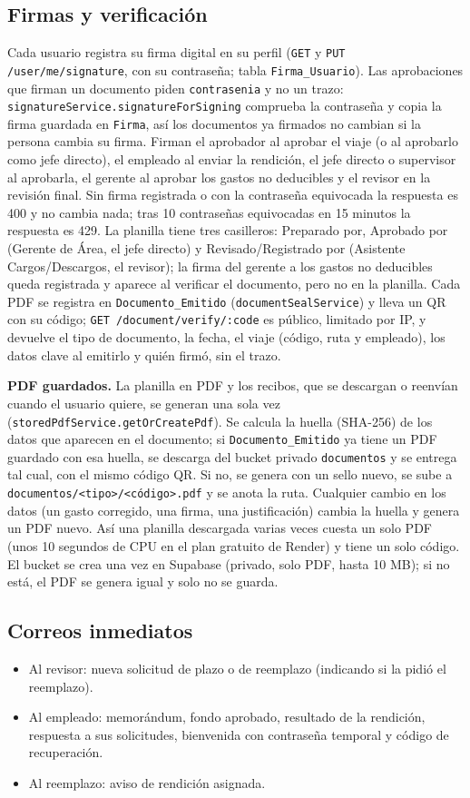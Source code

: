 \documentclass[11pt,letterpaper]{article}
\newcommand{\code}[1]{\nolinkurl{#1}}
\begin{document}
\subsection{Firmas y verificación}
Cada usuario registra su firma digital en su perfil (\code{GET} y \code{PUT /user/me/signature}, con su contraseña; tabla \code{Firma_Usuario}). Las aprobaciones que firman un documento piden \code{contrasenia} y no un trazo: \code{signatureService.signatureForSigning} comprueba la contraseña y copia la firma guardada en \code{Firma}, así los documentos ya firmados no cambian si la persona cambia su firma. Firman el aprobador al aprobar el viaje (o al aprobarlo como jefe directo), el empleado al enviar la rendición, el jefe directo o supervisor al aprobarla, el gerente al aprobar los gastos no deducibles y el revisor en la revisión final. Sin firma registrada o con la contraseña equivocada la respuesta es 400 y no cambia nada; tras 10 contraseñas equivocadas en 15 minutos la respuesta es 429. La planilla tiene tres casilleros: Preparado por, Aprobado por (Gerente de Área, el jefe directo) y Revisado/Registrado por (Asistente Cargos/Descargos, el revisor); la firma del gerente a los gastos no deducibles queda registrada y aparece al verificar el documento, pero no en la planilla. Cada PDF se registra en \code{Documento_Emitido} (\code{documentSealService}) y lleva un QR con su código; \code{GET /document/verify/:code} es público, limitado por IP, y devuelve el tipo de documento, la fecha, el viaje (código, ruta y empleado), los datos clave al emitirlo y quién firmó, sin el trazo.

\textbf{PDF guardados.} La planilla en PDF y los recibos, que se descargan o reenvían cuando el usuario quiere, se generan una sola vez (\code{storedPdfService.getOrCreatePdf}). Se calcula la huella (SHA-256) de los datos que aparecen en el documento; si \code{Documento_Emitido} ya tiene un PDF guardado con esa huella, se descarga del bucket privado \code{documentos} y se entrega tal cual, con el mismo código QR. Si no, se genera con un sello nuevo, se sube a \code{documentos/<tipo>/<código>.pdf} y se anota la ruta. Cualquier cambio en los datos (un gasto corregido, una firma, una justificación) cambia la huella y genera un PDF nuevo. Así una planilla descargada varias veces cuesta un solo PDF (unos 10 segundos de CPU en el plan gratuito de Render) y tiene un solo código. El bucket se crea una vez en Supabase (privado, solo PDF, hasta 10 MB); si no está, el PDF se genera igual y solo no se guarda.

\subsection{Correos inmediatos}
\begin{itemize}
  \item Al revisor: nueva solicitud de plazo o de reemplazo (indicando si la pidió el reemplazo).
  \item Al empleado: memorándum, fondo aprobado, resultado de la rendición, respuesta a sus solicitudes, bienvenida con contraseña temporal y código de recuperación.
  \item Al reemplazo: aviso de rendición asignada.
\end{itemize}
\end{document}
